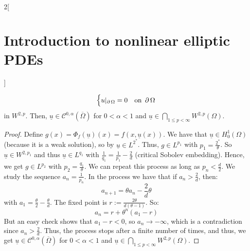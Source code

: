 \documentclass[../../../main_math.tex]{subfiles}
\begin{document}
\begin{multicols}{2}[\section{Introduction to nonlinear elliptic PDEs}]
\begin{theorem}[Bootstrap]
$$\begin{cases}
        u|_{\operatorname{\partial}{\Omega}}=0 & \text{on }\operatorname{\partial}{\Omega}
      \end{cases}
    $$
    in $W^{2,p}$. Then, $\underline{u}\in\mathcal{C}^{0,\alpha}(\overline{\Omega})$ for $0<\alpha<1$ and $\displaystyle \underline{u}\in \bigcap_{1\leq p<\infty}W^{2,p}(\Omega)$.
  \end{theorem}
  \begin{proof}
    Define $g(x)=\Phi_f(\underline{u})(x)=f(x,\underline{u}(x))$. We have that $\underline{u}\in H_0^1(\Omega)$ (because it is a weak solution), so by  $\underline{u}\in L^{2^*}$. Thus, $g\in L^{p_1}$ with $p_1=\frac{2^*}{\theta}$. So $\underline{u}\in W^{2,p_1}$ and thus $\underline{u}\in L^{q_1}$ with $\frac{1}{q_1}=\frac{1}{p_1}-\frac{2}{d}$ (critical Sobolev embedding). Hence, we get $g\in L^{p_2}$ with $p_2=\frac{q_1}{\theta}$. We can repeat this process as long as $p_n<\frac{d}{2}$. We study the sequence $a_n=\frac{1}{p_n}$. In the process we have that if $a_n>\frac{2}{d}$, then:
    $$
      a_{n+1}=\theta a_n-\frac{2}{d}\theta
    $$
    with $a_1=\frac{\theta}{2}-\frac{\theta}{d}$.
    The fixed point is $r:=\frac{2\theta}{d(\theta-1)}$. So:
    $$
      a_n=r+\theta^n(a_1-r)
    $$
    But an easy check shows that $a_1-r<0$, so $a_n\to -\infty$, which is a contradiction since $a_n> \frac{2}{d}$. Thus, the process stops after a finite number of times, and thus, we get $\underline{u}\in\mathcal{C}^{0,\alpha}(\overline{\Omega})$ for $0<\alpha<1$ and $\displaystyle \underline{u}\in \bigcap_{1\leq p<\infty}W^{2,p}(\Omega)$.
  \end{proof}

\end{multicols}
\end{document}
